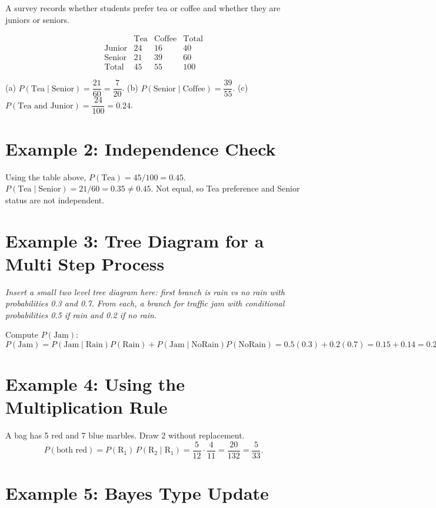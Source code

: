 \documentclass[12pt]{article}
\begin{document}
A survey records whether students prefer tea or coffee and whether they are juniors or seniors.

\[
\begin{array}{c|ccc}
 & \text{Tea} & \text{Coffee} & \text{Total}\\ \hline
\text{Junior} & 24 & 16 & 40\\
\text{Senior} & 21 & 39 & 60\\ \hline
\text{Total} & 45 & 55 & 100
\end{array}
\]

(a) \(P(\text{Tea}\mid \text{Senior})=\dfrac{21}{60}=\dfrac{7}{20}\).  
(b) \(P(\text{Senior}\mid \text{Coffee})=\dfrac{39}{55}\).  
(c) \(P(\text{Tea and Junior})=\dfrac{24}{100}=0.24\).

\section*{Example 2: Independence Check}

Using the table above, \(P(\text{Tea})=45/100=0.45\).  
\(P(\text{Tea}\mid \text{Senior})=21/60=0.35 \ne 0.45\).  
Not equal, so Tea preference and Senior status are not independent.

\section*{Example 3: Tree Diagram for a Multi Step Process}
\textit{Insert a small two level tree diagram here: first branch is rain vs no rain with probabilities 0.3 and 0.7. From each, a branch for traffic jam with conditional probabilities 0.5 if rain and 0.2 if no rain.}

Compute \(P(\text{Jam})\):  
\[
P(\text{Jam})=P(\text{Jam}\mid \text{Rain})P(\text{Rain})+P(\text{Jam}\mid \text{NoRain})P(\text{NoRain})
=0.5(0.3)+0.2(0.7)=0.15+0.14=0.29.
\]

\section*{Example 4: Using the Multiplication Rule}

A bag has 5 red and 7 blue marbles. Draw 2 without replacement.  
\[
P(\text{both red})=P(\text{R}_1)\,P(\text{R}_2\mid \text{R}_1)=\frac{5}{12}\cdot\frac{4}{11}=\frac{20}{132}=\frac{5}{33}.
\]

\section*{Example 5: Bayes Type Update}
\end{document}
